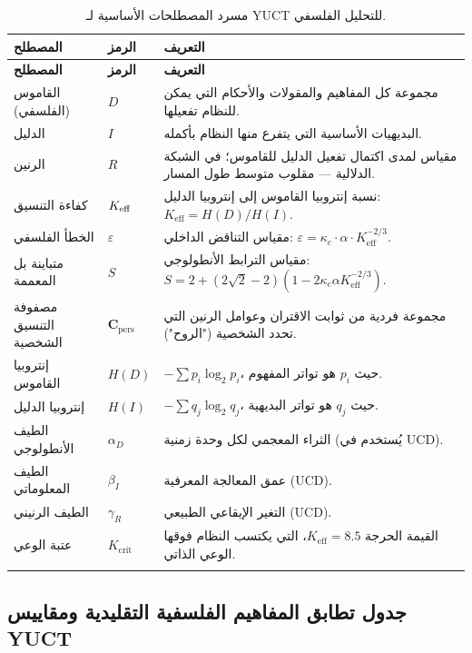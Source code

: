 \documentclass[11pt,a4paper]{article}
\newcommand{\kappac}{\kappa_c}
\newcommand{\eps}{\varepsilon}
\newcommand{\Cpers}{\mathbf{C}_{\text{pers}}}
\begin{document}
	\begin{longtable}{p{3.5cm}p{5cm}p{4cm}}
		\toprule
		\textbf{المصطلح} & \textbf{الرمز} & \textbf{التعريف} \\
		\midrule
		\endfirsthead
		\toprule
		\textbf{المصطلح} & \textbf{الرمز} & \textbf{التعريف} \\
		\midrule
		\endhead
		القاموس (الفلسفي) & \(D\) & مجموعة كل المفاهيم والمقولات والأحكام التي يمكن للنظام تفعيلها. \\
		الدليل & \(I\) & البديهيات الأساسية التي يتفرع منها النظام بأكمله. \\
		الرنين & \(R\) & مقياس لمدى اكتمال تفعيل الدليل للقاموس؛ في الشبكة الدلالية — مقلوب متوسط طول المسار. \\
		كفاءة التنسيق & \(\Keff\) & نسبة إنتروبيا القاموس إلى إنتروبيا الدليل: \(K_{\mathrm{eff}} = H(D)/H(I)\). \\
		الخطأ الفلسفي & \(\eps\) & مقياس التناقض الداخلي: \(\eps = \kappac \cdot \alpha \cdot K_{\mathrm{eff}}^{-2/3}\). \\
		متباينة بل المعممة & \(S\) & مقياس الترابط الأنطولوجي: \(S = 2 + (2\sqrt{2}-2)(1 - 2\kappac\alpha K_{\mathrm{eff}}^{-2/3})\). \\
		مصفوفة التنسيق الشخصية & \(\Cpers\) & مجموعة فردية من ثوابت الاقتران وعوامل الرنين التي تحدد الشخصية ("الروح"). \\
		إنتروبيا القاموس & \(H(D)\) & \( -\sum p_i \log_2 p_i\)، حيث \(p_i\) هو تواتر المفهوم. \\
		إنتروبيا الدليل & \(H(I)\) & \( -\sum q_j \log_2 q_j\)، حيث \(q_j\) هو تواتر البديهية. \\
		الطيف الأنطولوجي & \(\alpha_D\) & الثراء المعجمي لكل وحدة زمنية (يُستخدم في UCD). \\
		الطيف المعلوماتي & \(\beta_I\) & عمق المعالجة المعرفية (UCD). \\
		الطيف الرنيني & \(\gamma_R\) & التغير الإيقاعي الطبيعي (UCD). \\
		عتبة الوعي & \(K_{\mathrm{crit}}\) & القيمة الحرجة \(K_{\mathrm{eff}} = 8.5\)، التي يكتسب النظام فوقها الوعي الذاتي. \\
		\bottomrule
		\caption{مسرد المصطلحات الأساسية لـ YUCT للتحليل الفلسفي.}
		\label{tab:glossary}
	\end{longtable}
	
	\subsection{جدول تطابق المفاهيم الفلسفية التقليدية ومقاييس YUCT}
	
\end{document}
